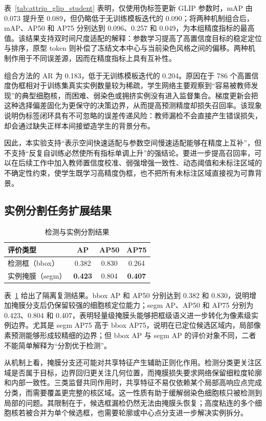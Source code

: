 表~\ref{tab:attrip_glip_student} 表明，仅使用伪标签更新 GLIP 参数时，mAP 由 0.073 提升至 0.089，但仍略低于无训练模板迭代的 0.090；将两种机制组合后，mAP、AP50 和 AP75 分别达到 0.096、0.257 和 0.049，为本组精度指标的最高值。该结果支持双时间尺度适配的解释：参数学习提高了高置信度目标的稳定定位与排序，原型 token 则补偿了冻结文本中心与当前染色风格之间的偏移。两种机制作用于不同误差源，因而在精度指标上具有互补性。

组合方法的 AR 为 0.183，低于无训练模板迭代的 0.204。原因在于 786 个高置信度伪框相对于训练集真实实例数量较为稀疏，学生网络主要观察到“容易被教师发现”的典型细胞核，而困难、弱染色或拥挤实例没有进入监督集合。梯度更新会把这种选择偏差固化为更保守的决策边界，从而提高预测精度却损失召回率。该现象说明伪标签闭环具有不可忽略的误差传递风险：教师漏检不会直接产生错误损失，却会通过缺失正样本间接塑造学生的背景分布。

因此，本实验支持“表示空间快速适配与参数空间慢速适配能够在精度上互补”，但不支持“反复自训练必然使所有指标单调上升”的强结论。要进一步提高召回率，可以在后续工作中加入教师置信度校准、弱强增强一致性、动态阈值和未标注区域的不确定性约束，使学生既学习高精度伪框，也不把所有未标注区域直接视为可靠背景。

\subsection{实例分割任务扩展结果}
\begin{table}[htbp]
\centering
\caption{检测与实例分割结果}
\label{tab:attrip_mask_head}
\begin{tabular}{lccc}
\toprule[1.5pt]
\textbf{评价类型} & \textbf{AP} & \textbf{AP50} & \textbf{AP75} \\ \midrule[1.2pt]
检测框（bbox） & 0.382 & 0.830 & 0.264 \\
实例掩膜（segm） & \textbf{0.423} & 0.804 & \textbf{0.407} \\ \bottomrule[1.5pt]
\end{tabular}
\end{table}

表~\ref{tab:attrip_mask_head} 给出了隔离复测结果。bbox AP 和 AP50 分别达到 0.382 和 0.830，说明增加掩膜分支后仍保留较强的细胞核定位能力；segm AP、AP50 和 AP75 分别为 0.423、0.804 和 0.407，表明轻量级掩膜头能够把框级语义进一步转化为像素级实例边界。尤其是 segm AP75 高于 bbox AP75，说明在已定位候选区域内，局部像素预测能够形成较精细的边界；但 bbox AP 与 segm AP 的评价对象不同，二者不能简单解释为“分割优于检测”。

从机制上看，掩膜分支还可能对共享特征产生辅助正则化作用。检测分类更关注区域是否属于目标，边界回归更关注几何位置，而掩膜损失要求网络保留细粒度轮廓和内部一致性。三类监督共同作用时，共享特征不易仅依赖某个局部高响应点完成分类，而需要覆盖更完整的核区域。这一性质有助于缓解弱染色细胞核只被检测到局部的问题。其限制在于，候选框漏检仍然无法由掩膜头恢复；高度粘连的多个细胞核若被合并为单个候选框，也需要轮廓或中心点分支进一步解决实例拆分。

